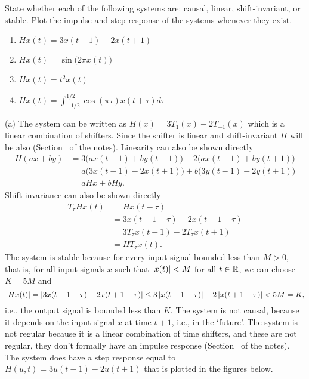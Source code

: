 \begin{excersizelist}
\item State whether each of the following systems are: causal, linear, shift-invariant, or stable.  Plot the impulse and step response of the systems whenever they exist.
\begin{enumerate}
\item $Hx(t) = 3x(t - 1) - 2x(t+1)$
\item $Hx(t) = \sin\big(2\pi x(t)\big)$
\item $Hx(t) = t^2 x(t)$
\item $Hx(t) = \int_{-1/2}^{1/2} \cos(\pi\tau) x(t + \tau) d\tau$
\end{enumerate}

\begin{solution}

(a) The system can be written as $H(x) = 3T_{1}(x) - 2T_{-1}(x)$ which is a linear combination of shifters.  Since the shifter is linear and shift-invariant $H$ will be also (Section~ of the notes).  Linearity can also be shown directly
\begin{align*}
H(ax + by)  &= 3\big( a x(t-1) + by(t-1) \big)  - 2\big( a x(t+1) + by(t+1) \big) \\
&= a\big(3x(t-1)-2x(t+1)\big) + b\big(3y(t-1)-2y(t+1)\big) \\
&= aHx + bHy.
\end{align*}
Shift-invariance can also be shown directly
\begin{align*}
T_\tau Hx(t) &= H x(t-\tau) \\
&= 3x(t-1-\tau)  - 2x(t+1-\tau) \\
&= 3T_\tau x(t-1)  - 2T_\tau x(t+1) \\
&= HT_\tau x(t).
\end{align*}
The system is stable because for every input signal bounded less than $M > 0$, that is, for all input signals $x$ such that $\left\vert x(t) \right\vert < M$ for all $t \in {\mathbb R}$, we can choose $K = 5M$ and
\[
\vert Hx(t) \vert = \vert 3x(t-1-\tau)  - 2x(t+1-\tau) \vert \leq 3\left\vert x(t-1-\tau) \right\vert + 2\left\vert x(t+1-\tau) \right\vert  < 5M = K,
\]
i.e., the output signal is bounded less than $K$.  The system is not causal, because it depends on the input signal $x$ at time $t+1$, i.e., in the `future'.  The system is not regular because it  is a linear combination of time shifters, and these are not regular, they don't formally have an impulse response (Section~ of the notes).  The system does have a step response equal to $H(u,t) = 3u(t-1)  - 2u(t+1)$ that is plotted in the figures below.


\end{solution}
\end{excersizelist}
